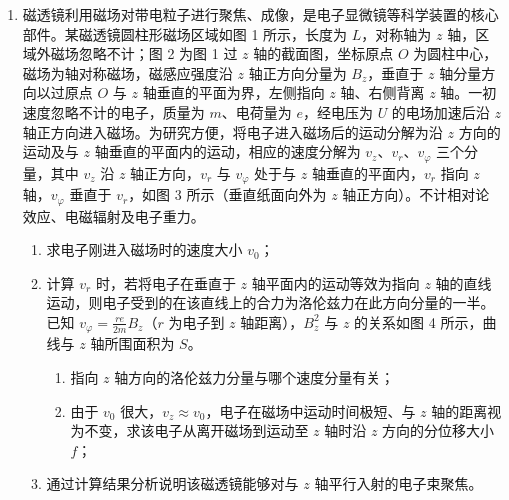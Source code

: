 \documentclass[\gkver]{gaokaozhenti}
\begin{document}
\begin{enumerate}
\item
磁透镜利用磁场对带电粒子进行聚焦、成像，是电子显微镜等科学装置的核心部件。某磁透镜圆柱形磁场区域如图 1 所示，长度为 $L$，对称轴为 $z$ 轴，区域外磁场忽略不计；图 2 为图 1 过 $z$ 轴的截面图，坐标原点 $O$ 为圆柱中心，磁场为轴对称磁场，磁感应强度沿 $z$ 轴正方向分量为 $B_{z}$，垂直于 $z$ 轴分量方向以过原点 $O$ 与 $z$ 轴垂直的平面为界，左侧指向 $z$ 轴、右侧背离 $z$ 轴。一初速度忽略不计的电子，质量为 $m$、电荷量为 $e$，经电压为 $U$ 的电场加速后沿 $z$ 轴正方向进入磁场。为研究方便，将电子进入磁场后的运动分解为沿 $z$ 方向的运动及与 $z$ 轴垂直的平面内的运动，相应的速度分解为 $v_{z}$、$v_{r}$、$v_{\varphi}$ 三个分量，其中 $v_{z}$ 沿 $z$ 轴正方向，$v_{r}$ 与 $v_{\varphi}$ 处于与 $z$ 轴垂直的平面内，$v_{r}$ 指向 $z$ 轴，$v_{\varphi}$ 垂直于 $v_{r}$，如图 3 所示（垂直纸面向外为 $z$ 轴正方向）。不计相对论效应、电磁辐射及电子重力。
\begin{enumerate}
	\item
	求电子刚进入磁场时的速度大小 $v_{0}$；
	\item
	计算 $v_{r}$ 时，若将电子在垂直于 $z$ 轴平面内的运动等效为指向 $z$ 轴的直线运动，则电子受到的在该直线上的合力为洛伦兹力在此方向分量的一半。已知 $v_{\varphi} = \frac{re}{2m}B_{z}$（$r$ 为电子到 $z$ 轴距离），$B_{z}^{2}$ 与 $z$ 的关系如图 4 所示，曲线与 $z$ 轴所围面积为 $S$。
	\begin{enumerate}[label=(\roman*)]
		\item
		指向 $z$ 轴方向的洛伦兹力分量与哪个速度分量有关；
		\item
		由于 $v_{0}$ 很大，$v_{z} \approx v_{0}$，电子在磁场中运动时间极短、与 $z$ 轴的距离视为不变，求该电子从离开磁场到运动至 $z$ 轴时沿 $z$ 方向的分位移大小 $f$；
	\end{enumerate}
	\item
	通过计算结果分析说明该磁透镜能够对与 $z$ 轴平行入射的电子束聚焦。
\end{enumerate}
\onepicture[align=right, w=13.00cm]{}
\end{enumerate}
\end{document}
